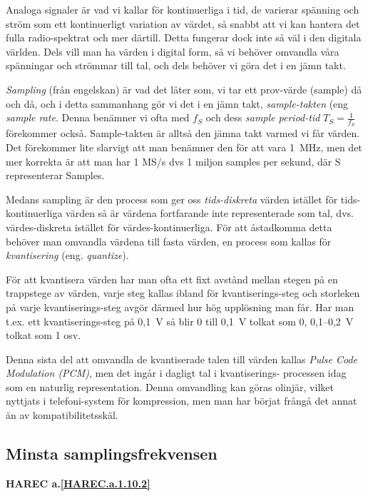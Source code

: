 \begin{rev-nytt}[MAD]

Analoga signaler är vad vi kallar för kontinuerliga i tid, de varierar spänning
och ström som ett kontinuerligt variation av värdet, så snabbt att vi kan
hantera det fulla radio-spektrat och mer därtill. Detta fungerar dock inte så
väl i den digitala världen. Dels vill man ha värden i digital form, så vi
behöver omvandla våra spänningar och strömmar till tal, och dels behöver vi
göra det i en jämn takt.

\emph{Sampling} (från engelskan) är vad det låter som, vi tar ett prov-värde
(sample) då och då, och i detta sammanhang gör vi det i en jämn takt,
\emph{sample-takten} (eng \emph{sample rate}. Denna benämner vi ofta med
\(f_S\) och dess \emph{sample period-tid} \(T_S=\frac{1}{f_S}\) förekommer
också. Sample-takten är alltså den jämna takt varmed vi får värden. Det
förekommer lite slarvigt att man benämner den för att vara 1~MHz, men det mer
korrekta är att man har 1 MS/s dvs 1 miljon samples per sekund, där S
representerar Samples.


Medans sampling är den process som ger oss \emph{tids-diskreta} värden istället
för tids-kontinuerliga värden så är värdena fortfarande inte representerade som
tal, dvs. värdes-diskreta istället för värdes-kontinuerliga. För att åstadkomma
detta behöver man omvandla värdena till fasta värden, en process som kallas för
\emph{kvantisering} (eng. \emph{quantize}).

För att kvantisera värden har man ofta ett fixt avstånd mellan stegen på en
trappstege av värden, varje steg kallas ibland för kvantiserings-steg och
storleken på varje kvantiserings-steg avgör därmed hur hög upplösning man får.
Har man t.ex. ett kvantiserings-steg på 0,1~V så blir 0 till 0,1~V tolkat som
0, 0,1--0,2~V tolkat som 1 osv.


Denna sista del att omvandla de kvantiserade talen till värden kallas
\emph{Pulse Code Modulation (PCM)}, men det ingår i dagligt tal i kvantiserings-
processen idag som en naturlig representation. Denna omvandling kan göras
olinjär, vilket nyttjats i telefoni-system för kompression, men man har börjat
frångå det annat än av kompatibilitetsskäl.

\end{rev-nytt}

\subsection{Minsta samplingsfrekvensen}
\textbf{HAREC a.\ref{HAREC.a.1.10.2}\label{myHAREC.a.1.10.2}}

